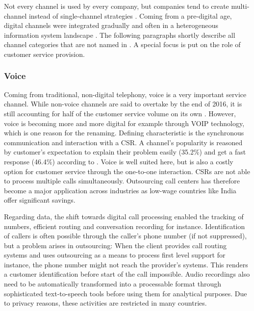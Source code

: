 		Not every channel is used by every company, but companies tend to create multi-channel instead of single-channel strategies \citep{Frow_2007}. Coming from a pre-digital age, digital channels were integrated gradually and often in a heterogeneous information system landscape \citep{Chen_2003}. The following paragraphs shortly describe all channel categories that are not named  in  \cite{paynefrow2005}. A special focus is put on the role of customer service provision. 
		
		
		\subsubsection{Voice}
		
		Coming from traditional, non-digital telephony, voice is a very important service channel. While non-voice channels are said to overtake by the end of 2016, it is still accounting for half of the customer service volume on its own \citep{dimensiondata2016}. However, voice is becoming more and more digital for example through \acrfull{VOIP} technology, which is one reason for the renaming. Defining characteristic is the synchronous communication and interaction with a \acrfull{CSR}. A channel's popularity is reasoned by customer's expectation to explain their problem easily (35.2\%) and get a fast response (46.4\%) according to \citep{Agnischock2015}. Voice is well suited here, but is also a costly option for customer service through the one-to-one interaction. \acrshort{CSR}s are not able to process multiple calls simultaneously. Outsourcing call centers has therefore become a major application across industries as low-wage countries like India offer significant savings. 
		
		Regarding data, the shift towards digital call processing enabled the tracking of numbers, efficient routing and conversation recording for instance. Identification of callers is often possible through the caller's phone number (if not suppressed), but a problem arises in outsourcing: When the client provides call routing systems and uses outsourcing as a means to process first level support for instance, the phone number might not reach the provider's systems. This renders a customer identification before start of the call impossible. Audio recordings also need to be automatically transformed into a processable format through sophisticated text-to-speech tools before using them for analytical purposes. Due to privacy reasons, these activities are restricted in many countries. 
		

